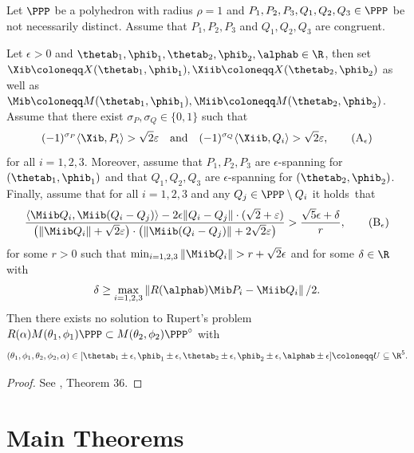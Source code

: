 \begin{theorem} \label{thm:local}
\leanok
{}
    Let $\PPP$ be a polyhedron with radius $\rho=1$ and $P_1, P_2, P_3, Q_1, Q_2, Q_3 \in \PPP$ be not necessarily distinct. Assume that $P_1, P_2, P_3$ and $Q_1, Q_2, Q_3$ are congruent.

    Let $\epsilon>0$ and $\thetab_1,\phib_1,\thetab_2,\phib_2,\alphab \in \R$, then set $\Xib \coloneqq X(\thetab_1,\phib_1), \Xiib \coloneqq X(\thetab_2,\phib_2)$ as well as $\Mib \coloneqq M(\thetab_1,\phib_1), \Miib \coloneqq M(\thetab_2,\phib_2)$.
    Assume that there exist $\sigma_P, \sigma_Q \in \{0,1\}$ such that
    \[
        (-1)^{\sigma_P} \langle \Xib,P_i\rangle>\sqrt{2}\varepsilon \quad \text{and} \quad
        (-1)^{\sigma_Q} \langle \Xiib , Q_i\rangle>\sqrt{2}\varepsilon, \tag{A$_\epsilon$}
    \]
    for all $i=1,2,3$.
    Moreover, assume that $P_1,P_2,P_3$ are $\epsilon$-spanning for $(\thetab_1,\phib_1)$ and that $Q_1,Q_2,Q_3$ are $\epsilon$-spanning for $(\thetab_2,\phib_2)$.
    Finally, assume that for all $i = 1,2,3$ and any $Q_j \in \PPP \setminus Q_i$ it holds~that
    \[
        \frac{\langle \Miib Q_i,\Miib (Q_i-Q_j)\rangle - 2 \epsilon \|Q_i-Q_j\| \cdot  (\sqrt{2}+\varepsilon)}{ \big(\|\Miib Q_i\|+\sqrt{2} \varepsilon \big) \cdot \big(\|\Miib(Q_i-Q_j)\|+2 \sqrt{2} \varepsilon\big)} > \frac{\sqrt{5} \epsilon + \delta}{r}, \tag{B$_\epsilon$}
    \]
    for some $r >0$ such that $\min_{i=1,2,3}\| \Miib Q_i \| > r + \sqrt{2} \epsilon$ and for some $\delta \in \R$ with
    \[
        \delta \geq \max_{i=1,2,3}\left\|R(\alphab) \Mib P_i - \Miib Q_i\right\|/2.
    \]
    Then there exists no solution to Rupert's problem $R(\alpha) M(\theta_1,\phi_1)\PPP \subset  M(\theta_2,\phi_2)\PPP^\circ$ with
    \[
        (\theta_1, \phi_1, \theta_2, \phi_2, \alpha) \in [\thetab_1\pm\epsilon,\phib_1\pm\epsilon,\thetab_2\pm\epsilon,\phib_2\pm\epsilon,\alphab\pm\epsilon] \coloneqq U \subseteq \R^5.
    \]
\end{theorem}

\begin{proof}\leanok
{}
See \cite{polyhedron.without.rupert}, Theorem 36.
\end{proof}


\chapter{Main Theorems}

